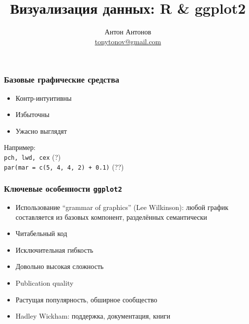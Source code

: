 \documentclass[compress]{beamer}\usepackage[]{graphicx}\usepackage[]{color}
\begin{document}
\title{Визуализация данных: R \& ggplot2}
\date{}
\author{Антон Антонов\\\href{mailto:tonytonov@gmail.com}{tonytonov@gmail.com}}
\maketitle

\begin{frame}[fragile]
\frametitle{Базовые графические средства}
\begin{itemize}
\item Контр-интуитивны \\
\item Избыточны \\
\item Ужасно выглядят \\
\end{itemize}
Например: \\
\texttt{pch, lwd, cex} (?) \\
\texttt{par(mar = c(5, 4, 4, 2) + 0.1)} (??)
\end{frame}

\begin{frame}[fragile]
\frametitle{Ключевые особенности \texttt{ggplot2}}
\begin{itemize}
\item Использование ``grammar of graphics'' (Lee Wilkinson): любой график составляется из базовых компонент, разделённых семантически
\item Читабельный код
\item Исключительная гибкость
\item Довольно высокая сложность
\item Publication quality
\item Растущая популярность, обширное сообщество
\item Hadley Wickham: поддержка, документация, книги
\end{itemize}
\end{frame}
\end{document}
